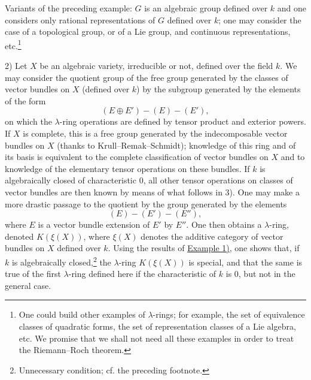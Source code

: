 Variants of the preceding example: $G$ is an algebraic group defined over $k$ and one considers only rational representations of $G$ defined over $k$; one may consider the case of a topological group, or of a Lie group, and continuous representations, etc.\footnote{One could build other examples of $\lambda$-rings; for example, the set of equivalence classes of quadratic forms, the set of representation classes of a Lie algebra, etc. We promise that we shall not need all these examples in order to treat the Riemann--Roch theorem.}

2) Let $X$ be an algebraic variety, irreducible or not, defined over the field $k$. We may consider the quotient group of the free group generated by the classes of vector bundles on $X$ (defined over $k$) by the subgroup generated by the elements of the form
\[
(E\oplus E')-(E)-(E'),
\]
on which the $\lambda$-ring operations are defined by tensor product and exterior powers. If $X$ is complete, this is a free group generated by the indecomposable vector bundles on $X$ (thanks to Krull--Remak--Schmidt); knowledge of this ring and of its basis is equivalent to the complete classification of vector bundles on $X$ and to knowledge of the elementary tensor operations on these bundles. If $k$ is algebraically closed of characteristic $0$, all other tensor operations on classes of vector bundles are then known by means of what follows in 3). One may make a more drastic passage to the quotient by the group generated by the elements
\[
(E)-(E')-(E''),
\]
where $E$ is a vector bundle extension of $E'$ by $E''$. One then obtains a $\lambda$-ring, denoted $K(\xi(X))$, where $\xi(X)$ denotes the additive category of vector bundles on $X$ defined over $k$. Using the results of \hyperlink{sga6.e00.ex.2-1}{Example 1)}, one shows that, if $k$ is algebraically closed,\footnote{Unnecessary condition; cf. the preceding footnote.} the $\lambda$-ring $K(\xi(X))$ is special, and that the same is true of the first $\lambda$-ring defined here if the characteristic of $k$ is $0$, but not in the general case.

